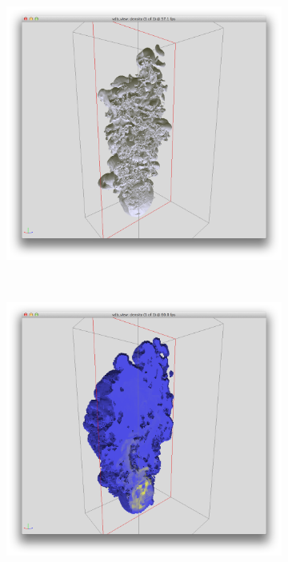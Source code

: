 \documentclass{beamer}
\begin{document}
\begin{frame}
\begin{figure}[H]
\begin{subfigure}{0.3\textwidth}
                \includegraphics[width=\textwidth]{vdb_view2}
        \end{subfigure}
        ~ %
        \begin{subfigure}{0.3\textwidth}
                \includegraphics[width=\textwidth]{vdb_view3}
        \end{subfigure}
\end{figure}


\end{frame}
\end{document}
